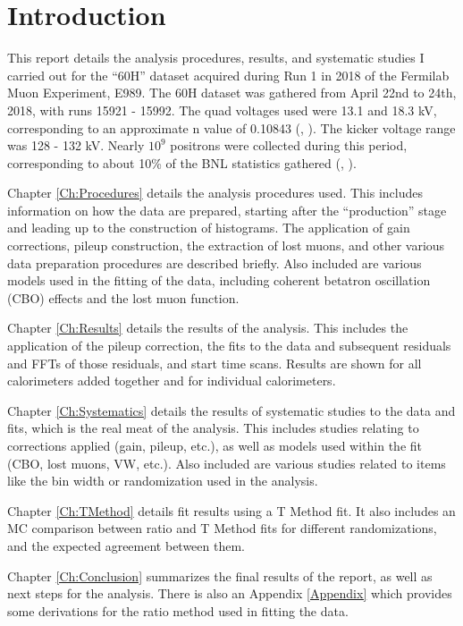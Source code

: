 \chapter{Introduction}
\label{Ch:Introduction}

This report details the analysis procedures, results, and systematic studies I carried out for the ``60H'' dataset acquired during Run 1 in 2018 of the Fermilab Muon \gmtwo Experiment, E989. The 60H dataset was gathered from April 22nd to 24th, 2018, with runs 15921 - 15992. The quad voltages used were 13.1 and 18.3 kV, corresponding to an approximate n value of 0.10843 (, \cite{Tunes}). The kicker voltage range was 128 - 132 kV. Nearly $10^{9}$ positrons were collected during this period, corresponding to about 10\% of the BNL statistics gathered (, \cite{HertzogAfterDenver}).

Chapter \ref{Ch:Procedures} details the analysis procedures used. This includes information on how the data are prepared, starting after the ``production'' stage and leading up to the construction of histograms. The application of gain corrections, pileup construction, the extraction of lost muons, and other various data preparation procedures are described briefly. Also included are various models used in the fitting of the data, including coherent betatron oscillation (CBO) effects and the lost muon function.

Chapter \ref{Ch:Results} details the results of the analysis. This includes the application of the pileup correction, the fits to the data and subsequent residuals and FFTs of those residuals, and start time scans. Results are shown for all calorimeters added together and for individual calorimeters.

Chapter \ref{Ch:Systematics} details the results of systematic studies to the data and fits, which is the real meat of the analysis. This includes studies relating to corrections applied (gain, pileup, etc.), as well as models used within the fit (CBO, lost muons, VW, etc.). Also included are various studies related to items like the bin width or randomization used in the analysis.

Chapter \ref{Ch:TMethod} details fit results using a T Method fit. It also includes an MC comparison between ratio and T Method fits for different randomizations, and the expected agreement between them.

Chapter \ref{Ch:Conclusion} summarizes the final results of the report, as well as next steps for the analysis. There is also an Appendix \ref{Appendix} which provides some derivations for the ratio method used in fitting the data.
